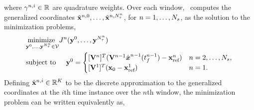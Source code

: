 where $\gamma^{n,i} \in \mathbb{R}^{}$ are quadrature weights. 
Over each window, \directMethodAcronym\ computes the generalized coordinates $\tilde{\mathbf{x}}^{n,0},\ldots,\tilde{\mathbf{x}}^{n,N_{\tau}^{n}}$, for $n=1,\ldots,N_s$, as the solution to the minimization problems,
\begin{align*}
&\underset{\stateyDiscreteArgnt{0},\ldots,\stateyDiscreteArgnt{\nstepsArg{n}} \in \trialspace}{\text{minimize } }
\objectiveArgLMS{n} (\stateyDiscreteArgnt{0},\ldots,\stateyDiscreteArgnt{\nstepsArg{n}}) \\
& \text{subject to} \hspace{0.2 in}  \stateyDiscreteArg{0} =
\begin{cases} \spatialIC & n = 2,\ldots,\nslabs,\\
\genstateICOne & n=1. \end{cases} \end{align*}
Defining $\hat{\mathbf{x}}^{n,i} \in \mathbb{R}^{K}$ to be the discrete approximation to the generalized coordinates at the $i$th time instance over the $n$th window, 
the minimization problem can be written equivalently as,
